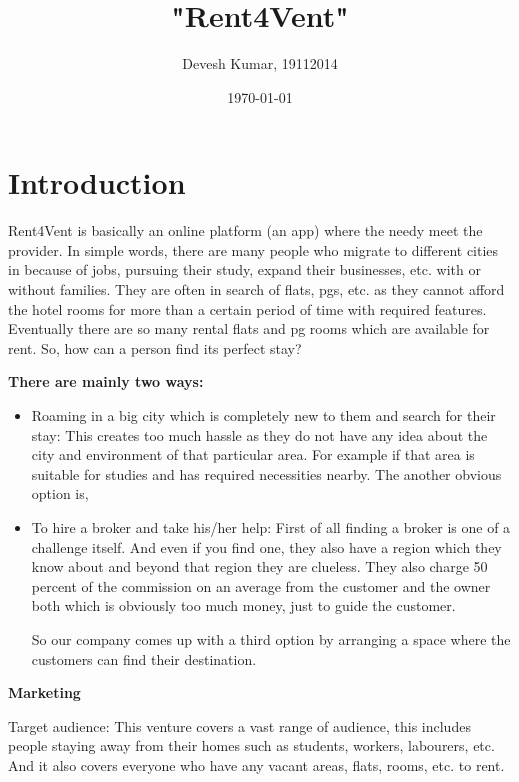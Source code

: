 \documentclass{article}
\title{\textbf{"Rent4Vent"}}
\author{Devesh Kumar, 19112014}
\date{\today}
\begin{document}
\maketitle

\section{Introduction}

\setlength{\parskip}{1em}

\large Rent4Vent is basically an online platform (an app) where the needy meet the provider. In simple words, there are many people who migrate to different cities in because of jobs, pursuing their study, expand their businesses, etc. with or without families. They are often in search of flats, pgs, etc. as they cannot afford the hotel rooms for more than a certain period of time with required features. Eventually there are so many rental flats and pg rooms which are available for rent. So, how can a person find its perfect stay? 

\setlength{\parskip}{1em}


\large{\textbf{There are mainly two ways:  }}
\begin{itemize}
    \item 	Roaming in a big city which is completely new to them and search for their stay: This creates too much hassle as they do not have any idea about the city and environment of that particular area. For example if that area is suitable for studies and has required necessities nearby. The another obvious option is,
    \item	To hire a broker and take his/her help: First of all finding a broker is one of a challenge itself. And even if you find one, they also have a region which they know about and beyond that region they are clueless. They also charge 50 percent of the commission on an average from the customer and the owner both which is obviously too much money, just to guide the customer.
    
\setlength{\parskip}{1em}

\large So our company comes up with a third option by arranging a space where the customers can find their destination. 
    
\end{itemize}

\large{\textbf{Marketing}}

Target audience: This venture covers a vast range of audience, this includes people staying away from their homes such as students, workers, labourers, etc. And it also covers everyone who have any vacant areas, flats, rooms, etc. to rent.
\end{document}
